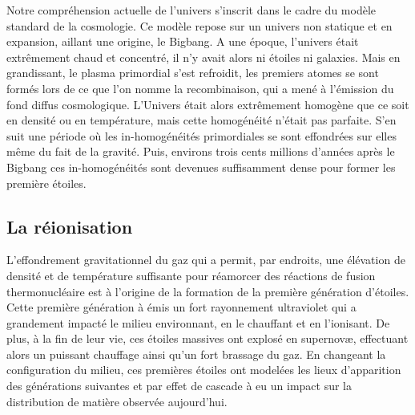 Notre compréhension actuelle de l'univers s'inscrit dans le cadre du modèle standard de la cosmologie.
Ce modèle repose sur un univers non statique et en expansion, aillant une origine, le Bigbang.
A une époque, l'univers était extrêmement chaud et concentré, il n'y avait alors ni étoiles ni galaxies.
Mais en grandissant, le plasma primordial s'est refroidit, les premiers atomes se sont formés lors de ce que l'on nomme la recombinaison, qui a mené à l'émission du fond diffus cosmologique.
L'Univers était alors extrêmement homogène que ce soit en densité ou en température, mais cette homogénéité n'était pas parfaite.
S'en suit une période où les in-homogénéités primordiales se sont effondrées sur elles même du fait de la gravité.
Puis, environs trois cents millions d'années après le Bigbang ces in-homogénéités sont devenues suffisamment dense pour former les première étoiles.

\subsection*{La réionisation}
L'effondrement gravitationnel du gaz qui a permit, par endroits, une élévation de densité et de température suffisante pour réamorcer des réactions de fusion thermonucléaire est à l'origine de la formation de la première génération d'étoiles.
Cette première génération à émis un fort rayonnement ultraviolet qui a grandement impacté le milieu environnant, en le chauffant et en l'ionisant. %
De plus, à la fin de leur vie, ces étoiles massives ont explosé en supernovæ, effectuant alors un puissant chauffage ainsi qu'un fort brassage du gaz.
En changeant la configuration du milieu, ces premières étoiles ont modelées les lieux d'apparition des générations suivantes et par effet de cascade à eu un impact sur la distribution de matière observée aujourd'hui.

